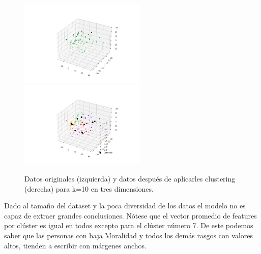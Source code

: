 \documentclass[10pt, a4paper]{article}
\begin{document}
		\begin{figure}[H]
			\centering
			\includegraphics[width = 6cm]{Original_Data_3d_bf.png}
			\includegraphics[width = 6cm]{Clustered_Data_3d_k10_seed45_bf.png}
			\caption{Datos originales (izquierda) y datos despu\'es de aplicarles clustering (derecha) para k=10 en tres dimensiones.}
		\end{figure}
		
		Dado al tama\~no del dataset y la poca diversidad de los datos el modelo no es capaz de extraer grandes conclusiones. N\'otese que el vector promedio de features por cl\'uster es igual en todos excepto para el cl\'uster n\'umero 7. De este podemos saber que las personas con baja Moralidad y todos los dem\'as rasgos con valores altos, tienden a escribir con m\'argenes anchos.
		
\end{document}
